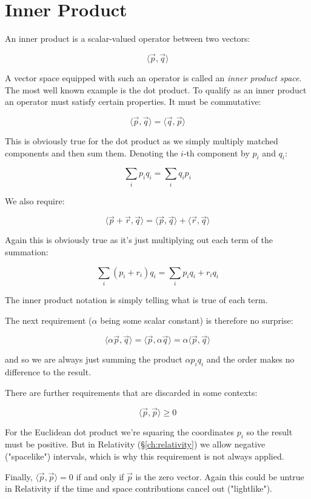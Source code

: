 \section{Inner Product}

An inner product is a scalar-valued operator between two vectors:

$$\langle \vec{p},\vec{q}\rangle$$

A vector space equipped with such an operator is called an \textit{inner product space}. The most well known example is the dot product. To qualify as an inner product an operator must satisfy certain properties. It must be commutative:

$$\langle \vec{p},\vec{q}\rangle = \langle \vec{q},\vec{p}\rangle$$

This is obviously true for the dot product as we simply multiply matched components and then sum them. Denoting the $i$-th component by $p_i$ and $q_i$:

$$\sum_i p_i q_i = \sum_i q_i p_i$$

We also require:

$$\langle \vec{p}+\vec{r},\vec{q}\rangle = \langle \vec{p},\vec{q}\rangle + \langle \vec{r},\vec{q}\rangle$$

Again this is obviously true as it's just multiplying out each term of the summation:

$$\sum_i (p_i + r_i)q_i = \sum_i p_iq_i + r_iq_i$$

The inner product notation is simply telling what is true of each term.

The next requirement ($\alpha$ being some scalar constant) is therefore no surprise:

$$\langle \alpha \vec{p},\vec{q}\rangle = \langle \vec{p},\alpha \vec{q}\rangle = \alpha \langle \vec{p},\vec{q}\rangle$$

and so we are always just summing the product $\alpha p_i q_i$ and the order makes no difference to the result.

There are further requirements that are discarded in some contexts:

$$\langle \vec{p},\vec{p}\rangle \geq 0$$

For the Euclidean dot product we're squaring the coordinates $p_i$ so the result must be positive. But in Relativity (§\ref{ch:relativity}) we allow negative ("spacelike") intervals, which is why this requirement is not always applied.

Finally, $\langle \vec{p},\vec{p}\rangle = 0$ if and only if $\vec{p}$ is the zero vector. Again this could be untrue in Relativity if the time and space contributions cancel out ("lightlike").

